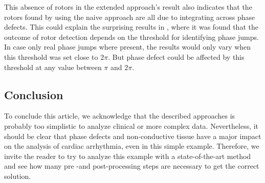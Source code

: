 \documentclass[twocolumn]{article}
\begin{document}
This absence of rotors in the extended approach's result also
indicates that the rotors found
by using the naive approach are all due to integrating across phase defects.
This could explain the surprising results in \textcite{li2020standardizing},
where it was found that the outcome of rotor detection
depends on the threshold for identifying phase jumps.
In case only real phase jumps where present,
the results would only vary when this threshold was set close to $2\pi$.
But phase defect could be affected by this threshold
at any value between $\pi$ and $2\pi$.



\subsection{Conclusion}

To conclude this article,
we acknowledge that the described approaches is probably too simplistic
to analyze clinical or more complex data.
Nevertheless, it should be clear
that phase defects and non-conductive tissue have a major impact
on the analysis of cardiac arrhythmia, even in this simple example.
Therefore, we invite the reader to try to analyze this example with a state-of-the-art method
and see how many pre -and post-processing steps are necessary to get the correct solution.
\end{document}

